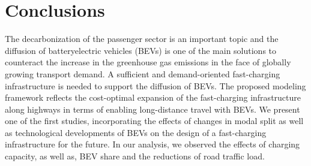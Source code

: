 \documentclass[journal,article,submit,pdftex,moreauthors]{Definitions/mdpi}
\begin{document}





\section{Conclusions}

The decarbonization of the passenger sector is an important topic and the diffusion of battery\added{-}electric vehicles (BEVs) is one of the main solutions to counteract the increase in the greenhouse gas emissions in the face of globally growing transport demand. A sufficient and demand-oriented fast-charging infrastructure is needed to support the diffusion of BEVs. The proposed modeling framework reflects the cost-optimal expansion of the fast-charging infrastructure along highways in terms of enabling long-distance travel with BEVs. We present one of the first studies, incorporating the effects of changes in modal split as well as technological developments of BEVs on the design of a fast-charging infrastructure for the future. In our analysis, we observed the effects of charging capacity, as well as, BEV share and the reductions of road traffic load.
\end{document}
